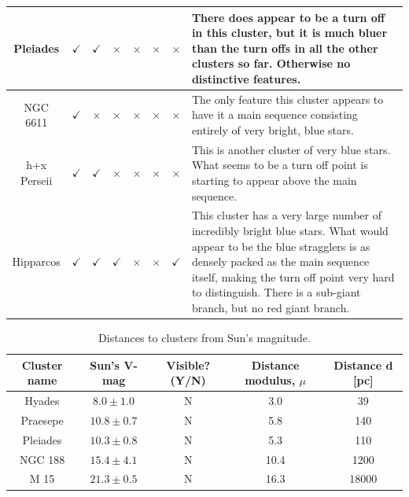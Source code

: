 \documentclass[11pt]{article}
\begin{document}
\begin{landscape}
\begin{table}[h]
\begin{tabular}{| c | c | c | c | c | c | c | p{11cm} |}
	Pleiades & $\checkmark$ & $\checkmark$ & $\times$ & $\times$ & $\times$ & $\times$ & There does appear to be a turn off in this cluster, but it is much bluer than the turn offs in all the other clusters so far. Otherwise no distinctive features. \\ \hline
	NGC 6611 & $\checkmark$ & $\times$ & $\times$ & $\times$ & $\times$ & $\times$ & The only feature this cluster appears to have it a main sequence consisting entirely of very bright, blue stars. \\ \hline
	h+x Perseii & $\checkmark$ & $\checkmark$ & $\times$ & $\times$ & $\times$ & $\times$ & This is another cluster of very blue stars. What seems to be a turn off point is starting to appear above the main sequence. \\ \hline
	Hipparcos & $\checkmark$ & $\checkmark$ & $\checkmark$ & $\times$ & $\times$ & $\checkmark$ & This cluster has a very large number of incredibly bright blue stars. What would appear to be the blue stragglers is as densely packed as the main sequence itself, making the turn off point very hard to distinguish. There is a sub-giant branch, but no red giant branch. \\
	\hline
\end{tabular}
\label{table:CMD_Features}
\end{table}
\end{landscape}

\begin{table}[h]
\caption{Distances to clusters from Sun's magnitude.}
\begin{tabular}{| c | c | c | c | c |}
	\hline
	Cluster name & Sun's V-mag & Visible? (Y/N) & Distance modulus, $\mu$ & Distance d [pc] \\ \hline
	Hyades & $8.0 \pm 1.0$ & N & 3.0 & 39 \\ \hline
	Praesepe & $10.8 \pm 0.7$ & N & 5.8 & 140 \\ \hline
	Pleiades & $10.3 \pm 0.8$ & N & 5.3 & 110 \\ \hline
	NGC 188 & $15.4 \pm 4.1$ & N & 10.4 & 1200 \\ \hline
	M 15 & $21.3 \pm 0.5$ & N & 16.3 & 18000 \\
	\hline
\end{tabular}
\label{table:CMD_distances}
\end{table}
\end{document}
